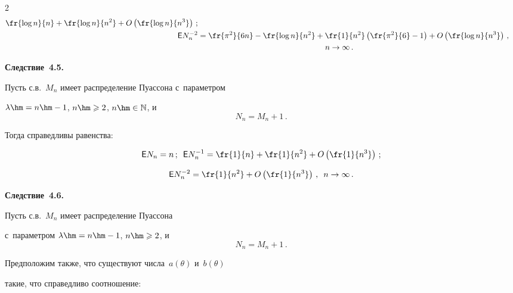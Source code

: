 \begin{multicols}{2}
\begin{align*}
\fr{\log n}{n} + \fr{\log n}{n^2} + O\left(\fr{\log n}{n^3}\right)\,;


\\


{\sf E} N_n^{-2} &= \fr{\pi^2}{6n} - \fr{\log n}{n^2} + 


\fr{1}{n^2} \left(\fr{\pi^2}{6} - 1\right) + O\left(\fr{\log n}{n^3}\right)\,,\\


&\hspace*{57mm}n \to \infty\,.


\end{align*}








\noindent


\textbf{Следствие~4.5.}\ 


Пусть с.в.~$M_n$ имеет распределение Пуассона с~параметром 


$\lambda\hm = n \hm- 1$, $n\hm \geqslant 2$, $n\hm \in \mathbb{N}$, и~$$


N_n = M_n + 1\,.


$$


Тогда справедливы равенства:


$$


{\sf E} N_n = n\,;\enskip


{\sf E} N_n^{-1} = \fr{1}{n} + \fr{1}{n^2} + O \left(\fr{1}{n^3}\right)\,;


$$


$$


{\sf E} N_n^{-2} = \fr{1}{n^2} + O\left(\fr{1}{n^3}\right)\,,\enskip


n \to \infty\,.


$$








\noindent


\textbf{Следствие~4.6.}\ 


Пусть с.в.~$M_n$ имеет распределение Пуассона 


с~параметром $\lambda\hm = n\hm-1$,  $n\hm \geqslant 2$, и~$$


N_n = M_n + 1\,.


$$


Предположим также, что существуют числа~$a(\theta)$ и~$b(\theta)$ 


такие, что справедливо соотношение:


$$ %



\end{multicols}
